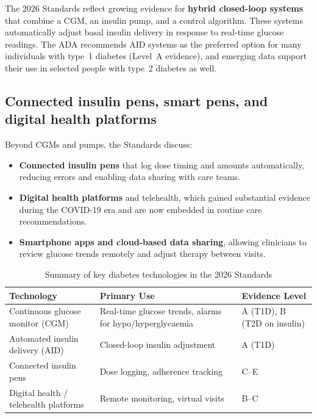 \documentclass[11pt,a4paper]{article}
\begin{document}
The 2026 Standards reflect growing evidence for \textbf{hybrid closed-loop
systems} that combine a CGM, an insulin pump, and a control algorithm. These
systems automatically adjust basal insulin delivery in response to real-time
glucose readings. The ADA recommends AID systems as the preferred option for
many individuals with type~1 diabetes (Level~A evidence), and emerging data
support their use in selected people with type~2 diabetes as well.

\subsection{Connected insulin pens, smart pens, and digital health platforms}

Beyond CGMs and pumps, the Standards discuss:

\begin{itemize}
  \item \textbf{Connected insulin pens} that log dose timing and amounts
        automatically, reducing errors and enabling data sharing with care
        teams.
  \item \textbf{Digital health platforms} and telehealth, which gained
        substantial evidence during the COVID-19 era and are now embedded in
        routine care recommendations.
  \item \textbf{Smartphone apps and cloud-based data sharing}, allowing
        clinicians to review glucose trends remotely and adjust therapy
        between visits.
\end{itemize}

\begin{table}[H]
\centering
\small
\caption{Summary of key diabetes technologies in the 2026 Standards}
\label{tab:tech}
\begin{tabularx}{\textwidth}{lYY}
\toprule
Technology & Primary Use & Evidence Level \\
\midrule
Continuous glucose monitor (CGM) & Real-time glucose trends, alarms for
hypo/hyperglycaemia & A (T1D), B (T2D on insulin) \\
Automated insulin delivery (AID) & Closed-loop insulin adjustment & A (T1D) \\
Connected insulin pens & Dose logging, adherence tracking & C--E \\
Digital health / telehealth platforms & Remote monitoring, virtual visits & B--C \\
\bottomrule
\end{tabularx}
\end{table}
\end{document}
